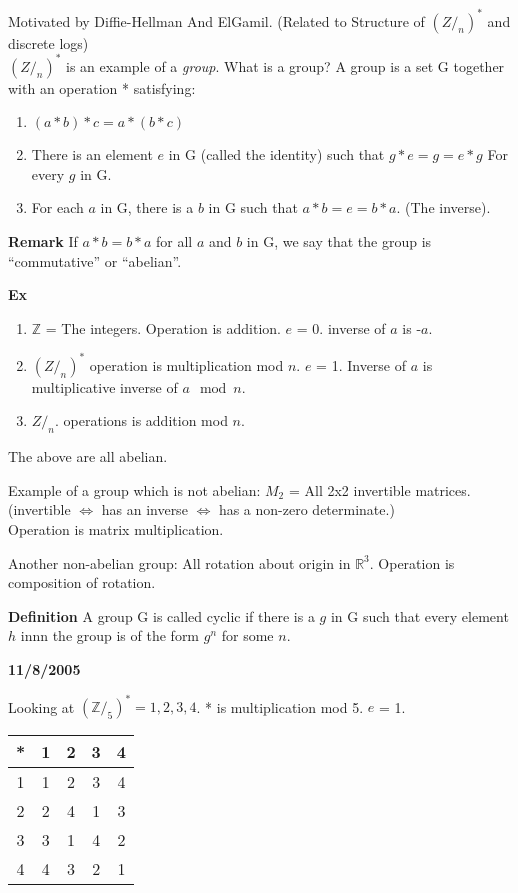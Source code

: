 Motivated by Diffie-Hellman And ElGamil. (Related to Structure of $(Z/_n)^*$ and discrete logs)\\
$(Z/_n)^*$ is an example of a \textit{group}. What is a group? A group is a set G together with an operation * satisfying:
\begin{enumerate}
\item $(a * b) * c = a * (b * c)$
\item There is an element $e$ in G (called the identity) such that $g * e = g = e * g$ For every $g$ in G.
\item For each $a$ in G, there is a $b$ in G such that $a * b = e = b * a$. (The inverse).
\end{enumerate}
\textbf{Remark} If $a * b = b * a$ for all $a$ and $b$ in G, we say that the group is ``commutative'' or ``abelian''.


\textbf{Ex} 
\begin{enumerate}
\item $\mathbb{Z}$ = The integers. Operation is addition. $e$ = 0. inverse of $a$ is -$a$.
\item $(Z/_n)^*$ operation is multiplication mod $n$. $e$ = 1. Inverse of $a$ is multiplicative inverse of $a \mod n$.
\item $Z/_n$. operations is addition mod $n$.
\end{enumerate}
The above are all abelian.

Example of a group which is not abelian: $M_2$ = All 2x2 invertible matrices.\\
(invertible $\iff$ has an inverse $\iff$ has a non-zero determinate.)\\
Operation is matrix multiplication.

Another non-abelian group: All rotation about origin in $\mathbb{R}^3$. Operation is composition of rotation.

\textbf{Definition} A group G is called cyclic if there is a $g$ in G such that every element $h$ innn the group is of the form $g^n$ for some $n$.

\textbf{11/8/2005}


Looking at $(\mathbb{Z}/_5)^* = {1,2,3,4}$. * is multiplication mod 5. $e$ = 1. \\
\begin{tabular}{|c||c|c|c|c|}\hline
* & 1 & 2 & 3 & 4 \\ \hline \hline
1 & 1 & 2 & 3 & 4 \\ \hline
2 & 2 & 4 & 1 & 3 \\ \hline
3 & 3 & 1 & 4 & 2 \\ \hline
4 & 4 & 3 & 2 & 1 \\ \hline
\end{tabular}

